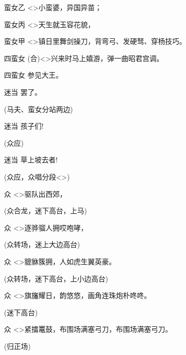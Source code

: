 {蛮女乙\hspace{20pt} \textless{}\!\textgreater{}小蛮婆，异国异苗；

蛮女丙\hspace{20pt} \textless{}\!\textgreater{}天生就玉容花貌，

蛮女甲\hspace{20pt} \textless{}\!\textgreater{}镇日里舞剑操刀，背弯弓、发硬驽、穿杨技巧。

四蛮女\hspace{20pt} ({\akai 合})\textless{}\!\textgreater{}兴来时马上嬉游，弹一曲昭君宫调。

四蛮女\hspace{20pt} 参见大王。

迷当\hspace{30pt} 罢了。

(马夫、蛮女{\hwfs 分站两边})

迷当\hspace{30pt} 孩子们!

(众{\hwfs 应})

迷当\hspace{30pt} 草上坡去者!

(众{\hwfs 应}，众{\hwfs 唱分段}\textless{}\!\textgreater{})

众\hspace{40pt} \textless{}\!\textgreater{}驱队出西郊，

(众{\hwfs 合龙}，迷{\hwfs 下高台}，{\hwfs 上马})

众\hspace{40pt} \textless{}\!\textgreater{}逐骅骝人拥哎咆哮，

(众{\hwfs 转场}，迷{\hwfs 上大边高台})

众\hspace{40pt} \textless{}\!\textgreater{}貔貅簇拥，人如虎生翼英豪。

(众{\hwfs 转场}，迷{\hwfs 下高台}，{\hwfs 上小边高台})

众\hspace{40pt} \textless{}\!\textgreater{}旗旛耀日，韵悠悠，画角连珠炮朴咚咚。

(迷{\hwfs 下高台})

众\hspace{40pt} \textless{}\!\textgreater{}紧擂鼍鼓，布围场满塞弓刀，布围场满塞弓刀。

({\hwfs 归正场})
}
